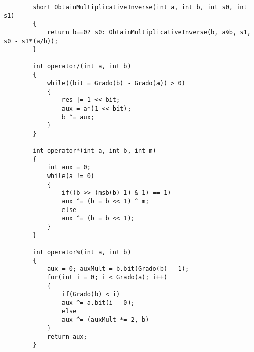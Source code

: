 \documentclass{article}
\begin{document}
	\begin{landscape}
		\begin{lstlisting}	
		short ObtainMultiplicativeInverse(int a, int b, int s0, int s1)
		{
			return b==0? s0: ObtainMultiplicativeInverse(b, a%b, s1, s0 - s1*(a/b));
		}
		
		int operator/(int a, int b)
		{
			while((bit = Grado(b) - Grado(a)) > 0)
			{
				res |= 1 << bit;
				aux = a*(1 << bit);
				b ^= aux;
			}
		}
		
		int operator*(int a, int b, int m)
		{
			int aux = 0;
			while(a != 0)
			{
				if((b >> (msb(b)-1) & 1) == 1)
				aux ^= (b = b << 1) ^ m;
				else
				aux ^= (b = b << 1);
			}
		}
		
		int operator%(int a, int b)
		{
			aux = 0; auxMult = b.bit(Grado(b) - 1);
			for(int i = 0; i < Grado(a); i++)
			{
				if(Grado(b) < i)
				aux ^= a.bit(i - 0);
				else
				aux ^= (auxMult *= 2, b)
			}
			return aux;
		}
		\end{lstlisting}
	\end{landscape}
\end{document}
